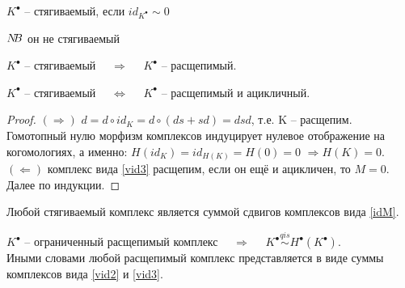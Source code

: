 \documentclass[../main.tex]{subfiles}
\begin{document}
\begin{to_def}
$K^\bullet$ -- стягиваемый, если $id_{K^\bullet}\sim 0$
\end{to_def}
\begin{to_ex}\label{idM}
\bee
\label{vid2}
\eee
\end{to_ex}
\begin{to_ex}
\bee
\label{vid3}
\eee
$N\kern-0.3em B$ он не стягиваемый
\end{to_ex}
\begin{to_suj}
$K^\bullet$ -- стягиваемый $\quad \Rightarrow \quad$ $K^\bullet$ -- расщепимый.
\bee
{}
\eee
\end{to_suj}
\begin{to_suj}
$K^\bullet$ -- стягиваемый $\quad \Leftrightarrow \quad$ $K^\bullet$ -- расщепимый и ацикличный.
\end{to_suj}
\begin{proof}
$(\Rightarrow)$ $d = d\circ id_K = d\circ(ds + sd) = dsd$, т.е. K -- расщепим. Гомотопный нулю морфизм комплексов индуцирует нулевое отображение на когомологиях, а именно: $H(id_K) = id_{H(K)} = H(0) = 0$ $\Rightarrow H(K)=0$. $(\Leftarrow)$ комплекс вида \ref{vid3} расщепим, если он ещё и ацикличен, то $M = 0$. Далее по индукции.
\end{proof}
\begin{to_suj}
Любой стягиваемый комплекс является суммой сдвигов комплексов вида \ref{idM}. 
\end{to_suj}
\begin{to_suj}\label{split1}
$K^\bullet$ -- ограниченный расщепимый комплекс $\quad \Rightarrow \quad$ $K^\bullet\overset{qis}{\sim}H^\bullet(K^\bullet)$. \\
Иными словами любой расщепимый комплекс представляется в виде суммы комплексов вида \ref{vid2} и \ref{vid3}.
\end{to_suj}
\end{document}
